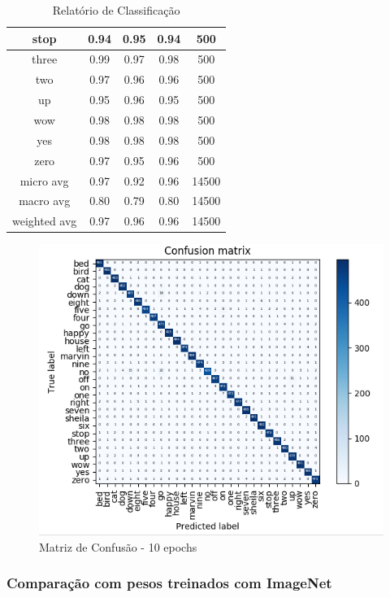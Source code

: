 \documentclass{bmvc2k}
\begin{document}
\begin{table}[ht]
\begin{tabular}{|c|c|c|c|c|}
        stop &      0.94  &    0.95  &    0.94 &      500 \\ \hline
       three &      0.99  &    0.97  &    0.98 &      500 \\ \hline
         two &      0.97  &    0.96  &    0.96 &      500 \\ \hline
          up &      0.95  &    0.96  &    0.95 &      500 \\ \hline
         wow &      0.98  &    0.98  &    0.98 &      500 \\ \hline
         yes &      0.98  &    0.98  &    0.98 &      500 \\ \hline
        zero &      0.97  &    0.95  &    0.96 &      500 \\ \hline

   micro avg &      0.97   &   0.92  &    0.96 &    14500 \\ 
   macro avg &      0.80   &   0.79  &    0.80 &    14500 \\ 
weighted avg &      0.97   &   0.96  &    0.96 &    14500 \\ \hline
\end{tabular}
\caption{Relatório de Classificação}
\end{table}

\begin{figure}[ht]
\centering
\includegraphics[scale=0.7]{imagens/mtxc.png} 
\caption{Matriz de Confusão - 10 epochs}
\end{figure}

\subsubsection*{Comparação com pesos treinados com ImageNet}
\end{document}
